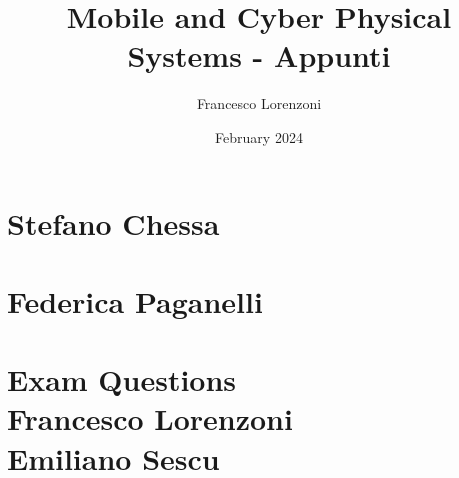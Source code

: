 
\title{Mobile and Cyber Physical Systems - Appunti}
\author{Francesco Lorenzoni}
\date{February 2024}


\setcounter{minitocdepth}{4}


\doparttoc[n]
\maketitle
\tableofcontents

\part{Stefano Chessa}
\parttoc















\part{Federica Paganelli}
\parttoc








\part{Exam Questions\\[\bigskipamount] 
\large Francesco Lorenzoni\\Emiliano Sescu}
\parttoc




